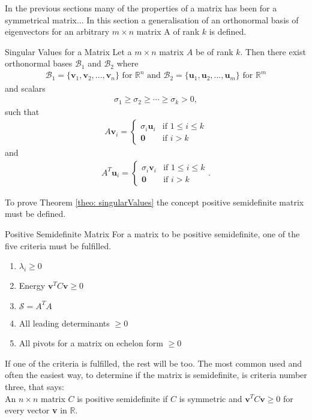 In the previous sections many of the properties of a matrix has been for a symmetrical matrix...
In this section a generalisation of an orthonormal basis of eigenvectors for an arbitrary $m \times n$ matrix A of rank $k$ is defined. 
\begin{theorem}{Singular Values for a Matrix}
Let a $m \times n$ matrix $A$ be of rank $k$. Then there exist orthonormal bases $\mathcal{B}_1$ and $\mathcal{B}_2$ where
\begin{align*}
    \mathcal{B}_1=\{\mathbf{v}_1,\mathbf{v}_2,...,\mathbf{v}_n\} \text{ for } \mathbb{R}^n \text{  and  } \mathcal{B}_2=\{\mathbf{u}_1,\mathbf{u}_2,...,\mathbf{u}_m\} \text{ for } \mathbb{R}^m
\end{align*}
and scalars
\begin{align*}
    \sigma_1 \geq \sigma_2 \geq \cdots \geq \sigma_k > 0, 
\end{align*}
such that
\begin{align}
    A\mathbf{v}_i=
    \begin{cases}
          \sigma_i\mathbf{u}_i & \text{if } 1\leq i\leq k\\
          \mathbf{0} & \text{if } i>k
    \end{cases}
\label{eq: eq3FromDefSingularValues}
\end{align}
and
\begin{align*}
    A^T\mathbf{u}_i=
    \begin{cases}
          \sigma_i\mathbf{v}_i & \text{if } 1\leq i\leq k\\
          \mathbf{0} & \text{if } i>k
    \end{cases}.
\end{align*}
\cite[439]{LiAl}
\label{theo: singularValues}
\end{theorem}
To prove Theorem \ref{theo: singularValues} the concept positive semidefinite matrix must be defined.
\begin{definition}{Positive Semidefinite Matrix}
    For a matrix to be positive semidefinite, one of the five criteria must be fulfilled. 
    \begin{enumerate}
        \item $\lambda_i \geq 0$
        \item Energy $\mathbf{v}^T C \mathbf{v} \geq 0$
        \item $\mathcal{S}=A^TA$
        \item All leading determinants $\geq 0$ 
        \item All pivots for a matrix on echelon form $\geq 0$ \\
        \cite{ryan2019linear}
    \end{enumerate}
    If one of the criteria is fulfilled, the rest will be too.
    The most common used and often the 
    easiest way, to determine if the matrix is semidefinite, is criteria number three, that says:\\
    An $n\times n$ matrix $C$ is positive semidefinite if $C$ is symmetric and $\mathbf{v}^T C \mathbf{v} \geq 0$ for every vector \textbf{v} in $\mathbb{R}$. 
    \label{def: PSD}
\cite[436]{LiAl}
\end{definition}
